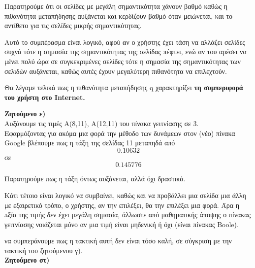 \documentclass{article}
\newcommand{\lt}{\latintext}
\newcommand{\gt}{\greektext}
\begin{document}
\gt Παρατηρούμε ότι οι σελίδες με μεγάλη σημαντικότητα χάνουν βαθμό καθώς η πιθανότητα μεταπήδησης
\gt αυξάνεται και κερδίζουν βαθμό όταν μειώνεται, και το αντίθετο για τις σελίδες μικρής
\gt σημαντικότητας.

\gt Αυτό το συμπέρασμα είναι λογικό, αφού αν ο χρήστης έχει τάση να αλλάζει σελίδες συχνά τότε
\gt η σημασία της σημαντικότητας της σελίδας πέφτει, ενώ αν του αρέσει να μένει πολύ ώρα σε
\gt συγκεκριμένες σελίδες τότε η σημασία της σημαντικότητας των σελιδών αυξάνεται, καθώς αυτές
\gt έχουν μεγαλύτερη πιθανότητα να επιλεχτούν.

\gt Θα λέγαμε τελικά πως η πιθανότητα μεταπήδησης \lt q \gt χαρακτηρίζει
\textbf{\gt τη συμπεριφορά του χρήστη στο \lt Internet.}

\newpage
\textbf{\gt Ζητούμενο ε)}\\

\gt Αυξάνουμε τις τιμές Α(8,11), Α(12,11) του πίνακα γειτνίασης σε 3.\\
\gt Εφαρμόζοντας για ακόμα μια φορά την μέθοδο των δυνάμεων στον (νέο) πίνακα \lt Google
\gt βλέπουμε πως η τάξη της σελίδας 11 μεταπηδά από
\begin{equation*}
    0.10632
\end{equation*}
\gt σε
\begin{equation*}
    0.145776
\end{equation*}

\gt Παρατηρούμε πως η τάξη όντως αυξάνεται, αλλά όχι δραστικά.

\gt Κάτι τέτοιο είναι λογικό να συμβαίνει, καθώς και να προβάλλει μια σελίδα μια άλλη με
\gt εξαιρετικό τρόπο, ο χρήστης, αν την επιλέξει, θα την επιλέξει μια φορά.
\gt Άρα η aξία της τιμής δεν έχει μεγάλη σημασία, άλλωστε από μαθηματικής άποψης
\gt ο πίνακας γειτνίασης νοιάζεται μόνο αν μια τιμή είναι μηδενική ή όχι (είναι πίνακας \lt Boole).

 να συμπεράνουμε
\gt πως η τακτική αυτή δεν είναι τόσο καλή, σε σύγκριση με την τακτική του ζητούμενου γ).\\

\newpage
\textbf{\gt Ζητούμενο στ)}\\
\end{document}
